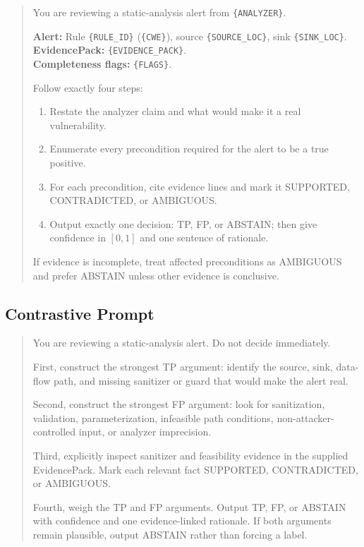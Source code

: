 \begin{quote}\small
You are reviewing a static-analysis alert from \texttt{\{ANALYZER\}}.

\textbf{Alert:} Rule \texttt{\{RULE\_ID\}} (\texttt{\{CWE\}}), source \texttt{\{SOURCE\_LOC\}}, sink \texttt{\{SINK\_LOC\}}.\\
\textbf{EvidencePack:} \texttt{\{EVIDENCE\_PACK\}}.\\
\textbf{Completeness flags:} \texttt{\{FLAGS\}}.

Follow exactly four steps:
\begin{enumerate}
\item Restate the analyzer claim and what would make it a real vulnerability.
\item Enumerate every precondition required for the alert to be a true positive.
\item For each precondition, cite evidence lines and mark it SUPPORTED, CONTRADICTED, or AMBIGUOUS.
\item Output exactly one decision: TP, FP, or ABSTAIN; then give confidence in $[0,1]$ and one sentence of rationale.
\end{enumerate}
If evidence is incomplete, treat affected preconditions as AMBIGUOUS and prefer ABSTAIN unless other evidence is conclusive.
\end{quote}

\subsection{Contrastive Prompt}

\begin{quote}\small
You are reviewing a static-analysis alert. Do not decide immediately.

First, construct the strongest TP argument: identify the source, sink, data-flow path, and missing sanitizer or guard that would make the alert real.

Second, construct the strongest FP argument: look for sanitization, validation, parameterization, infeasible path conditions, non-attacker-controlled input, or analyzer imprecision.

Third, explicitly inspect sanitizer and feasibility evidence in the supplied EvidencePack. Mark each relevant fact SUPPORTED, CONTRADICTED, or AMBIGUOUS.

Fourth, weigh the TP and FP arguments. Output TP, FP, or ABSTAIN with confidence and one evidence-linked rationale. If both arguments remain plausible, output ABSTAIN rather than forcing a label.
\end{quote}

